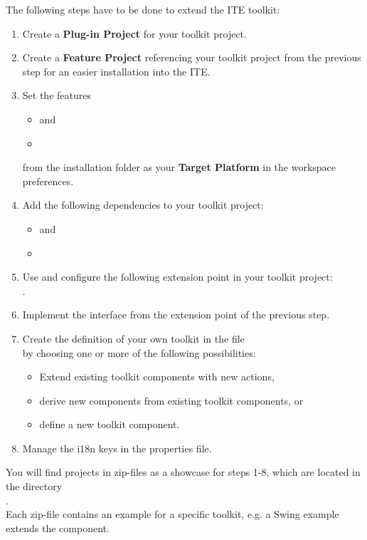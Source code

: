 The following steps have to be done to extend the ITE toolkit:
\begin{enumerate}
 \item Create a \textbf{Plug-in Project} for your toolkit project.
 \item Create a \textbf{Feature Project} referencing your toolkit project from
 the previous step for an easier installation into the ITE.
 \item Set the features
       \begin{itemize}
        \item {} and
        \item {}
       \end{itemize}
       from the \app{} installation folder \bxshell{\MakeLowercase{\app{}}/} as
       your \textbf{Target Platform} in the workspace preferences.
 \item Add the following dependencies to your toolkit project:
       \begin{itemize}
        \item {} and
        \item {}
       \end{itemize}
 \item Use and configure the following extension point in your toolkit
       project:\\
       .
 \item Implement the interface  from the extension
 point of the previous step.
 \item Create the definition of your own toolkit in the file\\
        by choosing one or more of the following
       possibilities:
       \begin{itemize}
        \item Extend existing toolkit components with new actions,
        \item derive new components from existing toolkit components, or
        \item define a new toolkit component.
       \end{itemize}
 \item Manage the i18n keys in the properties file.
\end{enumerate}

You will find projects in zip-files as a showcase for steps 1-8, which are
located in the directory\\
.\\
Each zip-file contains an example for a specific toolkit, e.g. a Swing example
extends the  component.

